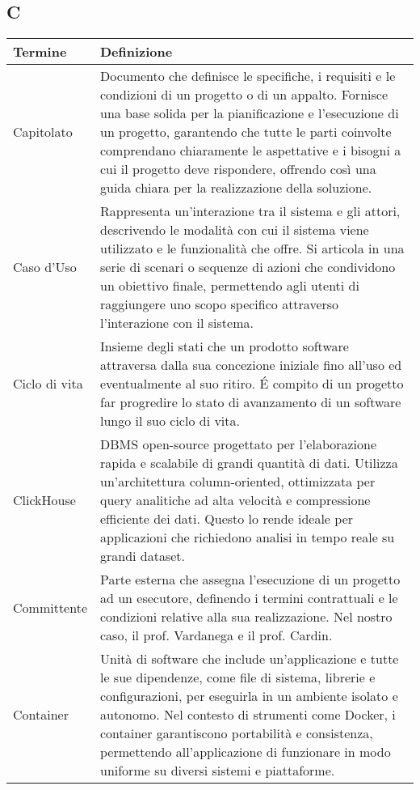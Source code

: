 \documentclass[10pt]{article}
\begin{document}
\subsection{C} %
\begin{longtable}{|>{\centering\arraybackslash}m{2.5cm}|>{\arraybackslash}m{12.5cm}|}
\hline
\rowcolor[gray]{0.8}
\textbf{Termine} & \textbf{Definizione}\\
\endhead
\hline
Capitolato & Documento che definisce le specifiche, i requisiti e le condizioni di un progetto o di un appalto. Fornisce una base solida per la pianificazione e l’esecuzione di un progetto, garantendo che tutte le parti coinvolte comprendano chiaramente le aspettative e i bisogni a cui il progetto deve rispondere, offrendo così una guida chiara per la realizzazione della soluzione.\\
\hline
Caso d'Uso & Rappresenta un'interazione tra il sistema e gli attori, descrivendo le modalità con cui il sistema viene utilizzato e le funzionalità che offre. Si articola in una serie di scenari o sequenze di azioni che condividono un obiettivo finale, permettendo agli utenti di raggiungere uno scopo specifico attraverso l'interazione con il sistema.\\
\hline
Ciclo di vita & Insieme degli stati che un prodotto software attraversa dalla sua concezione iniziale fino all'uso ed eventualmente al suo ritiro. \'E compito di un progetto far progredire lo stato di avanzamento di un software lungo il suo ciclo di vita.\\
\hline
ClickHouse & DBMS open-source progettato per l'elaborazione rapida e scalabile di grandi quantità di dati. Utilizza un'architettura column-oriented, ottimizzata per query analitiche ad alta velocità e compressione efficiente dei dati. Questo lo rende ideale per applicazioni che richiedono analisi in tempo reale su grandi dataset.\\
\hline
Committente & Parte esterna che assegna l'esecuzione di un progetto ad un esecutore, definendo i termini contrattuali e le condizioni relative alla sua realizzazione. Nel nostro caso, il prof. Vardanega e il prof. Cardin.\\
\hline
Container & Unità di software che include un'applicazione e tutte le sue dipendenze, come file di sistema, librerie e configurazioni, per eseguirla in un ambiente isolato e autonomo. Nel contesto di strumenti come Docker, i container garantiscono portabilità e consistenza, permettendo all'applicazione di funzionare in modo uniforme su diversi sistemi e piattaforme.\\

\end{longtable}
\end{document}
